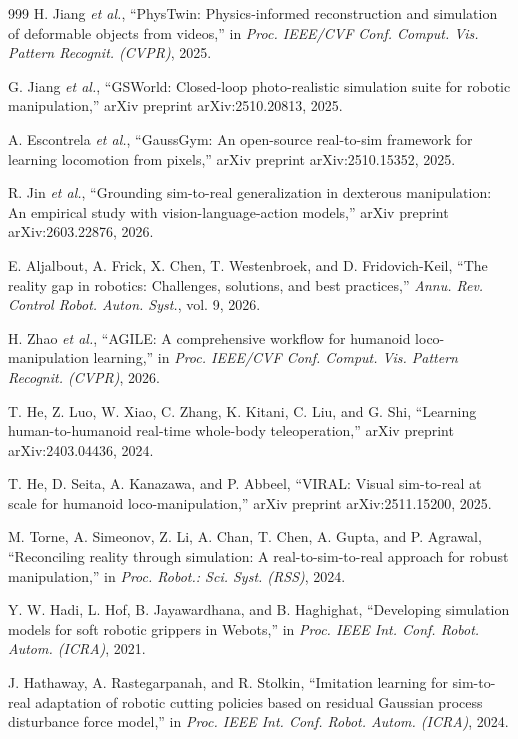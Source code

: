 ﻿\documentclass[11pt,a4paper]{article}
\begin{document}
\begin{thebibliography}{999}
H. Jiang \textit{et al.}, ``PhysTwin: Physics-informed reconstruction and simulation of deformable objects from videos,'' in \textit{Proc. IEEE/CVF Conf. Comput. Vis. Pattern Recognit. (CVPR)}, 2025.

G. Jiang \textit{et al.}, ``{GSWorld}: Closed-loop photo-realistic simulation suite for robotic manipulation,'' arXiv preprint arXiv:2510.20813, 2025.

A. Escontrela \textit{et al.}, ``{GaussGym}: An open-source real-to-sim framework for learning locomotion from pixels,'' arXiv preprint arXiv:2510.15352, 2025.

R. Jin \textit{et al.}, ``Grounding sim-to-real generalization in dexterous manipulation: An empirical study with vision-language-action models,'' arXiv preprint arXiv:2603.22876, 2026.


E. Aljalbout, A. Frick, X. Chen, T. Westenbroek, and D. Fridovich-Keil, ``The reality gap in robotics: Challenges, solutions, and best practices,'' \textit{Annu. Rev. Control Robot. Auton. Syst.}, vol. 9, 2026.

H. Zhao \textit{et al.}, ``{AGILE}: A comprehensive workflow for humanoid loco-manipulation learning,'' in \textit{Proc. IEEE/CVF Conf. Comput. Vis. Pattern Recognit. (CVPR)}, 2026.

T. He, Z. Luo, W. Xiao, C. Zhang, K. Kitani, C. Liu, and G. Shi, ``Learning human-to-humanoid real-time whole-body teleoperation,'' arXiv preprint arXiv:2403.04436, 2024.

T. He, D. Seita, A. Kanazawa, and P. Abbeel, ``{VIRAL}: Visual sim-to-real at scale for humanoid loco-manipulation,'' arXiv preprint arXiv:2511.15200, 2025.

M. Torne, A. Simeonov, Z. Li, A. Chan, T. Chen, A. Gupta, and P. Agrawal, ``Reconciling reality through simulation: A real-to-sim-to-real approach for robust manipulation,'' in \textit{Proc. Robot.: Sci. Syst. (RSS)}, 2024.

Y. W. Hadi, L. Hof, B. Jayawardhana, and B. Haghighat, ``Developing simulation models for soft robotic grippers in Webots,'' in \textit{Proc. IEEE Int. Conf. Robot. Autom. (ICRA)}, 2021.

J. Hathaway, A. Rastegarpanah, and R. Stolkin, ``Imitation learning for sim-to-real adaptation of robotic cutting policies based on residual Gaussian process disturbance force model,'' in \textit{Proc. IEEE Int. Conf. Robot. Autom. (ICRA)}, 2024.


\end{thebibliography}
\end{document}
